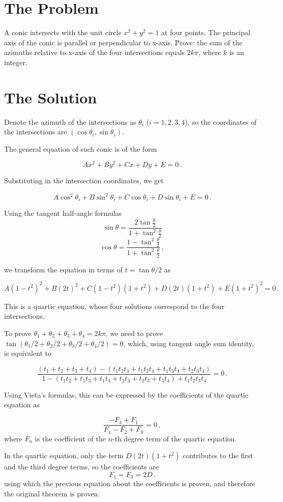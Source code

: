 \documentclass[]{article}
\begin{document}
\section{The Problem}

A conic intersects with the unit circle $x^2+y^2=1$ at four points. The principal axis of the conic is parallel or perpendicular to x-axis. Prove: the sum of the azimuths relative to x-axis of the four intersections equals $2k\pi$, where $k$ is an integer.

\section{The Solution}

Denote the azimuth of the intersections as $\theta_i$ ($i = 1, 2, 3, 4$), so the coordinates of the intersections are $(\cos \theta_i, \sin \theta_i)$.

The general equation of such conic is of the form

\[
Ax^2+By^2+Cx+Dy+E=0 \, .
\]

Substituting in the intersection coordinates, we get

\[
A\cos^2 \theta_i + B\sin^2 \theta_i + C\cos \theta_i + D\sin \theta_i + E = 0\,.
\]

Using the tangent half-angle formulas
\[
\sin \theta = \frac{2\tan\frac{\theta}{2}}{1+\tan^2\frac{\theta}{2}}
\]
\[
\cos \theta = \frac{1-\tan^2\frac{\theta}{2}}{1+\tan^2\frac{\theta}{2}} \, ,
\]

we transform the equation in terms of $t = \tan \theta/2$ as

\[
A (1-t^2)^2 + B(2t)^2 + C(1-t^2)(1+t^2)+D(2t)(1+t^2)+E(1+t^2)^2=0\, .
\]

This is a quartic equation, whose four solutions correspond to the four intersections.

To prove $\theta_1 + \theta_2 + \theta_3 + \theta_4 = 2k\pi$, we need to prove $\tan(\theta_1/2 + \theta_2/2 +\theta_3/2 +\theta_4/2 ) = 0$, which, using tangent angle sum identity, is equivalent to

\[
\frac{(t_1 + t_2 + t_3 + t_4) - (t_1t_2t_3 + t_1t_2t_4 + t_1t_3t_4 + t_2t_3t_4)}{1 - (t_1t_2 + t_1t_3 + t_1t_4 + t_2t_3 + t_2t_3+t_3t_4) + t_1t_2t_3t_4} = 0 \, .
\] 

Using Vieta's formulas, this can be expressed by the coefficients of the quartic equation as

\[
\frac{-F_3+F_1}{F_4-F_2+F_0} = 0 \, ,
\]
where $F_n$ is the coefficient of the $n$-th degree term of the quartic equation.

In the quartic equation, only the term $D(2t)(1+t^2)$ contributes to the first and the third degree terms, so the coefficients are
\[
	F_1 = F_3 = 2D \, .
\]
using which the previous equation about the coefficients is proven, and therefore the original theorem is proven.
\end{document}
